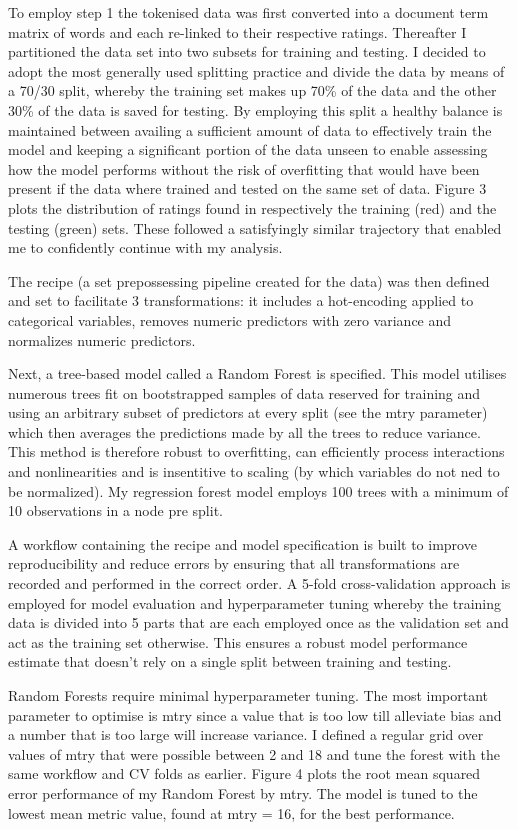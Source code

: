 \documentclass[11pt,preprint]{elsarticle}
\numberwithin{equation}{section}
\numberwithin{figure}{section}
\numberwithin{table}{section}
\begin{document}
To employ step 1 the tokenised data was first converted into a document
term matrix of words and each re-linked to their respective ratings.
Thereafter I partitioned the data set into two subsets for training and
testing. I decided to adopt the most generally used splitting practice
and divide the data by means of a 70/30 split, whereby the training set
makes up 70\% of the data and the other 30\% of the data is saved for
testing. By employing this split a healthy balance is maintained between
availing a sufficient amount of data to effectively train the model and
keeping a significant portion of the data unseen to enable assessing how
the model performs without the risk of overfitting that would have been
present if the data where trained and tested on the same set of data.
Figure 3 plots the distribution of ratings found in respectively the
training (red) and the testing (green) sets. These followed a
satisfyingly similar trajectory that enabled me to confidently continue
with my analysis.

The recipe (a set prepossessing pipeline created for the data) was then
defined and set to facilitate 3 transformations: it includes a
hot-encoding applied to categorical variables, removes numeric
predictors with zero variance and normalizes numeric predictors.

Next, a tree-based model called a Random Forest is specified. This model
utilises numerous trees fit on bootstrapped samples of data reserved for
training and using an arbitrary subset of predictors at every split (see
the mtry parameter) which then averages the predictions made by all the
trees to reduce variance. This method is therefore robust to
overfitting, can efficiently process interactions and nonlinearities and
is insentitive to scaling (by which variables do not ned to be
normalized). My regression forest model employs 100 trees with a minimum
of 10 observations in a node pre split.

A workflow containing the recipe and model specification is built to
improve reproducibility and reduce errors by ensuring that all
transformations are recorded and performed in the correct order. A
5-fold cross-validation approach is employed for model evaluation and
hyperparameter tuning whereby the training data is divided into 5 parts
that are each employed once as the validation set and act as the
training set otherwise. This ensures a robust model performance estimate
that doesn't rely on a single split between training and testing.

Random Forests require minimal hyperparameter tuning. The most important
parameter to optimise is mtry since a value that is too low till
alleviate bias and a number that is too large will increase variance. I
defined a regular grid over values of mtry that were possible between 2
and 18 and tune the forest with the same workflow and CV folds as
earlier. Figure 4 plots the root mean squared error performance of my
Random Forest by mtry. The model is tuned to the lowest mean metric
value, found at mtry = 16, for the best performance.
\end{document}

